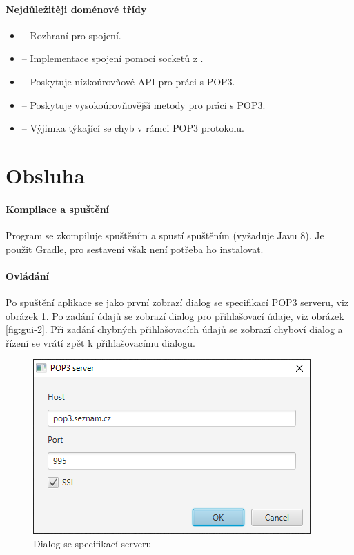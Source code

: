 \documentclass[12pt, a4paper]{article}
\begin{document}
\paragraph{Nejdůležitěji doménové třídy}
\begin{itemize}
	\item {} -- Rozhraní pro spojení.
	\item {} -- Implementace spojení pomocí socketů z .
	\item {} -- Poskytuje nízkoúrovňové API pro práci s POP3.
	\item {} -- Poskytuje vysokoúrovňovější metody pro práci s POP3.
	\item {} -- Výjimka týkající se chyb v rámci POP3 protokolu.
\end{itemize}


\section*{Obsluha}

\paragraph{Kompilace a spuštění}
Program se zkompiluje spuštěním  a spustí spuštěním  (vyžaduje Javu 8).
Je použit Gradle, pro sestavení však není potřeba ho instalovat.

\paragraph{Ovládání}
Po spuštění aplikace se jako první zobrazí dialog se specifikací POP3 serveru, viz obrázek \ref{fig:gui-1}.
Po zadání údajů se zobrazí dialog pro přihlašovací údaje, viz obrázek \ref{fig:gui-2}.
Při zadání chybných přihlašovacích údajů se zobrazí chyboví dialog a řízení se vrátí zpět k přihlašovacímu dialogu.

\begin{figure}[H]
	\centering
	\includegraphics[width=0.6\linewidth]{gui-1}
	\caption{Dialog se specifikací serveru}
	\label{fig:gui-1}
\end{figure}
\end{document}
